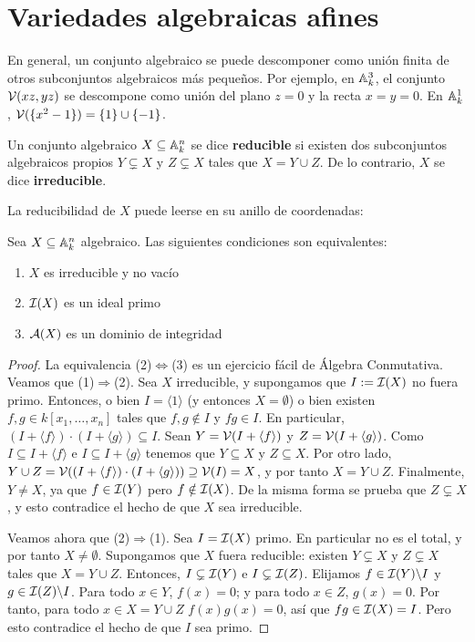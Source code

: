 \documentclass[ACGA.tex]{subfiles}
\begin{document}
\section{Variedades algebraicas afines}

En general, un conjunto algebraico se puede descomponer como unión finita de otros subconjuntos algebraicos más pequeños. Por ejemplo, en $\mathbb{A}^3_k$, el conjunto $\mathcal{V}({xz,yz})$ se descompone como unión del plano $z=0$ y la recta $x=y=0$. En $\mathbb{A}^1_k$, $\mathcal{V}(\{x^2-1\})=\{1\}\cup\{-1\}$.

\begin{defi}
 Un conjunto algebraico $X\subseteq \mathbb{A}^n_k$ se dice {\bf reducible} si existen dos subconjuntos algebraicos propios $Y\subsetneq X$ y $Z\subsetneq X$ tales que $X=Y\cup Z$. De lo contrario, $X$ se dice {\bf irreducible}.
\end{defi}

La reducibilidad de $X$ puede leerse en su anillo de coordenadas:

\begin{prop}
 Sea $X\subseteq\mathbb{A}^n_k$ algebraico. Las siguientes condiciones son equivalentes:
\begin{enumerate}
 \item $X$ es irreducible y no vacío
\item $\mathcal{I}(X)$ es un ideal primo
\item $\mathcal{A}(X)$ es un dominio de integridad
\end{enumerate}

\end{prop}

\begin{proof}
 La equivalencia (2)$\Longleftrightarrow$(3) es un ejercicio fácil de Álgebra Conmutativa. Veamos que (1)$\Rightarrow$(2). Sea $X$ irreducible, y supongamos que $I:=\mathcal{I}(X)$ no fuera primo. Entonces, o bien $I=\langle 1\rangle$ (y entonces $X=\emptyset$) o bien existen $f,g\in k[x_1,\ldots,x_n]$ tales que $f,g\notin I$ y $fg\in I$. En particular, $(I+\langle f\rangle)\cdot(I+\langle g\rangle)\subseteq I$. Sean $Y=\mathcal{V}(I+\langle f\rangle)$ y $Z=\mathcal{V}(I+\langle g \rangle)$. Como $I\subseteq I+\langle f \rangle$ e $I\subseteq I+\langle g\rangle$ tenemos que $Y\subseteq X$ y $Z\subseteq X$. Por otro lado, $Y\cup Z=\mathcal{V}((I+\langle f\rangle)\cdot(I+\langle g\rangle))\supseteq\mathcal{V}(I)=X$, y por tanto $X=Y\cup Z$. Finalmente, $Y\neq X$, ya que $f\in\mathcal{I}(Y)$ pero $f\notin \mathcal{I}(X)$. De la misma forma se prueba que $Z\subsetneq X$, y esto contradice el hecho de que $X$ sea irreducible.

Veamos ahora que (2)$\Rightarrow$(1). Sea $I=\mathcal{I}(X)$ primo. En particular no es el total, y por tanto $X\neq\emptyset$. Supongamos que $X$ fuera reducible: existen $Y\subsetneq X$ y $Z\subsetneq X$ tales que $X=Y\cup Z$. Entonces, $I\subsetneq\mathcal{I}(Y)$ e $I\subsetneq\mathcal{I}(Z)$. Elijamos $f\in \mathcal{I}(Y)\backslash I$ y $g\in\mathcal{I}(Z)\backslash I$. Para todo $x\in Y$, $f(x)=0$; y para todo $x\in Z$, $g(x)=0$. Por tanto, para todo $x\in X=Y\cup Z$ $f(x)g(x)=0$, así que $fg\in\mathcal{I}(X)=I$. Pero esto contradice el hecho de que $I$ sea primo.
\end{proof}
\end{document}
